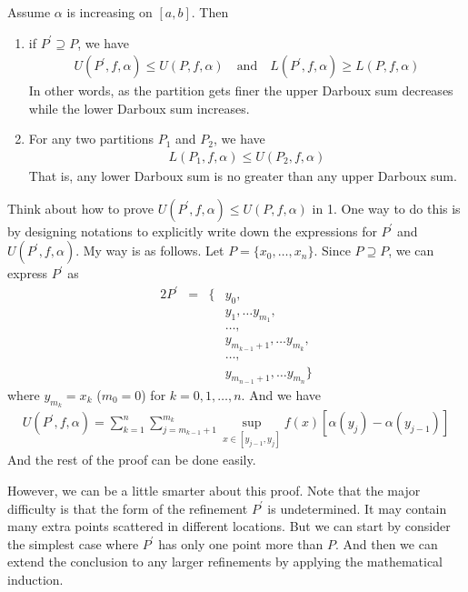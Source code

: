 \documentclass[thmcnt=section, color=blue, 12pt]{my-elegantbook}
\begin{document}
\begin{theorem} \label{thm:9}
	Assume $\alpha$ is increasing on $[a, b]$. Then
	\begin{enumerate}
		\item if $P^\prime \supseteq P$,  we have
		      \begin{align*}
			      U(P^\prime, f, \alpha) \leq U(P, f, \alpha)
			      \quad \text{and} \quad
			      L(P^\prime, f, \alpha) \geq L(P, f, \alpha)
		      \end{align*}
		      In other words, as the partition gets finer the upper Darboux sum decreases
		      while the lower Darboux sum increases.
		\item For any two partitions $P_1$ and $P_2$, we have
		      \begin{align*}
			      L(P_1, f, \alpha) \leq U(P_2, f, \alpha)
		      \end{align*}
		      That is, any lower Darboux sum is no greater than any upper Darboux sum.
	\end{enumerate}
\end{theorem}

Think about how to prove $U(P^\prime, f, \alpha) \leq U(P, f, \alpha)$ in 1.
One way to do this is by designing notations to
explicitly write down
the expressions for $P^\prime$ and $U(P^\prime, f, \alpha)$.
My way is as follows.
Let $P = \{x_0, \ldots, x_n\}$.
Since $P \supseteq P$, we can express $P^\prime$ as
\begin{alignat*}{2}
	P^\prime & = & \{ & y_{0},                           \\
	         &   &    & y_{1}, \ldots y_{m_1},           \\
	         &   &    & \ldots,                          \\
	         &   &    & y_{m_{k-1}+1}, \ldots y_{m_k},   \\
	         &   &    & \ldots,                          \\
	         &   &    & y_{m_{n-1}+1}, \ldots y_{m_n} \}
\end{alignat*}
where $y_{m_k} = x_k$ ($m_0 = 0$) for $k=0, 1, \ldots, n$.
And we have
\begin{align*}
	U(P^\prime, f, \alpha)
	= \sum_{k=1}^n \sum_{j=m_{k-1} + 1}^{m_k}
	\sup_{x \in [y_{j-1}, y_{j}]}
	f(x) [\alpha(y_{j}) - \alpha(y_{j-1})]
\end{align*}
And the rest of the proof can be done easily.

However, we can be a little smarter about this proof.
Note that the major difficulty is that
the form of the refinement $P^\prime$
is undetermined.
It may contain many extra points scattered in different locations.
But we can start by consider the simplest case
where $P^\prime$ has only one point more than $P$.
And then we can extend the conclusion to any
larger refinements by applying the mathematical induction.
\end{document}
